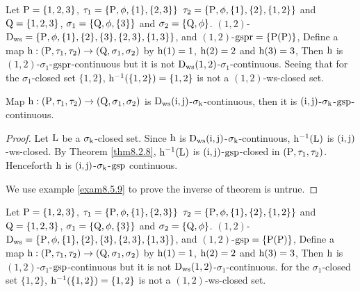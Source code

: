 \begin{exm}\label{exam8.5.8}
Let $\mathrm{P}=\{1,2,3\}$, $\tau_1 =\{\mathrm{P}, \phi, \{1\}, \{2,3\}\}$ $\tau_2 =\{\mathrm{P}, \phi, \{1\},\{2\},\{1,2\}\}$ and $\mathrm{Q}=\{1,2,3\}$, $\sigma_{1} =\{\mathrm{Q}, \phi, \{3\}\}$ and $\sigma_{2} =\{\mathrm{Q}, \phi\}$. $(1, 2)$-$\clrD_{\ws} =\{\TSP, \phi, \{1\},\{2\},\{3\},\break \{2,3\},\{1,3\}\}$, and $(1,2)$-$\mathrm{gspr} =\{\mathrm{P}(\mathrm{P})\}$, Define a map $\mathrm{h}:(\mathrm{P}, \tau_1, \tau_2 )\to (\mathrm{Q}, \sigma_{1}, \sigma_{2} )$ by $\mathrm{h}(1)=1$, $\mathrm{h}(2)=2$ and $\mathrm{h}(3)=3$, Then $\mathrm{h}$ is $(1, 2)$-$\sigma_{1}$-$\mathrm{gspr}$-continuous but it is not $\mathrm{D}_{\mathrm{ws}} (1, 2)$-$\sigma_{1}$-continuous. Seeing that for the $\sigma_{1}$-closed set $\{1,2\}$, $\mathrm{h}^{-1} (\{1,2\})=\{1,2\}$ is not a $(1, 2)$-ws-closed set.
\end{exm}

\begin{thm}\label{thm8.5.9}
Map $\mathrm{h}:(\mathrm{P}, \tau_1, \tau_2 )\to (\mathrm{Q}, \sigma_{1}, \sigma_{2} )$ is $\mathrm{D}_{\mathrm{ws}} (\mathrm{i}, \mathrm{j})$-$\sigma_{\mathrm{k}}$-continuous, then it is $(\mathrm{i}, \mathrm{j})$-$\sigma_{\mathrm{k}}$-$\mathrm{gsp}$-continuous.
\end{thm}

\begin{proof}
Let $\mathrm{L}$ be a $\sigma_{\mathrm{k}}$-closed set. Since $\mathrm{h}$ is $\mathrm{D}_{\mathrm{ws}} (\mathrm{i}, \mathrm{j})$-$\sigma_{\mathrm{k}}$-continuous, $\mathrm{h}^{-1} (\mathrm{L})$ is $(\mathrm{i}, \mathrm{j})$-ws-closed. By Theorem \ref{thm8.2.8}, $\mathrm{h}^{-1} (\mathrm{L})$ is $(\mathrm{i}, \mathrm{j})$-$\mathrm{gsp}$-closed in $(\mathrm{P}, \tau_1, \tau_2 )$. Henceforth $\mathrm{h}$ is $(\mathrm{i}, \mathrm{j})$-$\sigma_{\mathrm{k}}$-$\mathrm{gsp}$ continuous.

We use example \ref{exam8.5.9} to prove the inverse of theorem is untrue.
\end{proof}

\begin{exm}\label{exam8.5.9}
Let $\mathrm{P}=\{1,2,3\}$, $\tau_1 =\{\mathrm{P}, \phi, \{1\}, \{2,3\}\}$ $\tau_2 =\{\mathrm{P}, \phi, \{1\},\{2\},\{1,2\}\}$ and $\mathrm{Q}=\{1,2,3\}$, $\sigma_{1} =\{\mathrm{Q}, \phi, \{3\}\}$ and $\sigma_{2} =\{\mathrm{Q}, \phi\}$. $(1,2)$-$\clrD_{\ws} =\{\TSP, \phi, \{1\},\{2\},\{3\},\break\{2,3\},\{1,3\}\}$, and $(1,2)$-$\mathrm{gsp} =\{\mathrm{P}(\mathrm{P})\}$, Define a map $\mathrm{h}:(\mathrm{P}, \tau_1, \tau_2 )\to (\mathrm{Q}, \sigma_{1}, \sigma_{2} )$ by $\mathrm{h}(1)=1$, $\mathrm{h}(2)=2$ and $\mathrm{h}(3)=3$, Then $\mathrm{h}$ is $(1, 2)$-$\sigma_{1}$-$\mathrm{gsp}$-continuous but it is not $\mathrm{D}_{\mathrm{ws}} (1, 2)$-$\sigma_{1}$-continuous. for the $\sigma_{1}$-closed set $\{1,2\}$, $\mathrm{h}^{-1} (\{1,2\})=\{1,2\}$ is not a $(1, 2)$-ws-closed set.
\end{exm}

